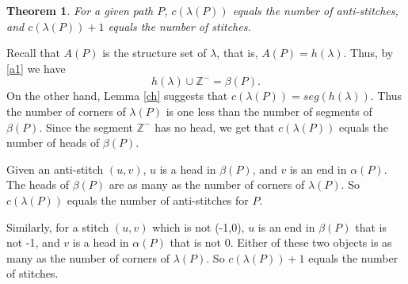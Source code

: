 \documentclass[a4paper,12pt]{article}
\def\proof{\noindent {\it{Proof.} \hskip 2pt}}
\newtheorem{thm}{Theorem}[section]
\begin{document}
\begin{thm} \label{thm_cor_equals_antiStitches}
For a given path $P$, $c(\lambda(P))$ equals the number of anti-stitches, and  $c(\lambda(P))+1$ equals the number of stitches.
\end{thm}

\proof Recall that $A(P)$ is the structure set of $\lambda$, that is, $A(P)=h(\lambda)$. Thus, by \eqref{a1} we have
\[h(\lambda) \cup \mathbb{Z}^-= \beta(P). \]
On the other hand, Lemma \ref{ch} suggests that $ c(\lambda(P))=seg( h(\lambda) )$. Thus the number of corners of $\lambda(P)$ is one less than the number of segments of $\beta(P)$. Since the segment $\mathbb{Z}^-$ has no head, we get that $c(\lambda(P))$ equals the number of heads of $\beta(P)$.

Given an anti-stitch $(u,v)$,  $u$ is a head in $\beta(P)$,
and  $v$  is an end in $\alpha(P)$.
The heads of $\beta(P)$ are as many as the number of corners of $\lambda(P)$. So $c(\lambda(P))$ equals the number of anti-stitches for $P$.

Similarly, for a stitch $(u,v)$ which is not  (-1,0),  $u$ is an end in $\beta(P)$ that is not -1, and  $v$ is a   head  in $\alpha(P)$ that is not 0. Either of these two objects is as many as the number of corners of $\lambda(P)$. So $c(\lambda(P))+1$ equals the number of stitches.

%
%
%
\end{document}
